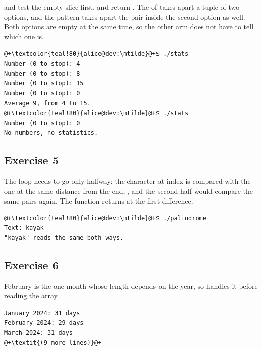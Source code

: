  and  test the empty slice first, and return
. The  of  takes apart a tuple of two
options, and the pattern  takes apart the
pair inside the second option as well. Both options are empty at the same time,
so the other arm does not have to tell which one is.


\vspace{-10pt}%
\begin{lstlisting}[style=bashVerb, escapechar=@+]
@+\textcolor{teal!80}{alice@dev:\mtilde}@+$ ./stats
Number (0 to stop): 4
Number (0 to stop): 8
Number (0 to stop): 15
Number (0 to stop): 0
Average 9, from 4 to 15.
@+\textcolor{teal!80}{alice@dev:\mtilde}@+$ ./stats
Number (0 to stop): 0
No numbers, no statistics.
\end{lstlisting}

\subsection*{Exercise 5}

The loop needs to go only halfway: the character at index  is compared
with the one at the same distance from the end, , and
the second half would compare the same pairs again. The function returns
 at the first difference.


\vspace{-10pt}%
\begin{lstlisting}[style=bashVerb, escapechar=@+]
@+\textcolor{teal!80}{alice@dev:\mtilde}@+$ ./palindrome
Text: kayak
"kayak" reads the same both ways.
\end{lstlisting}

\subsection*{Exercise 6}

February is the one month whose length depends on the year, so 
handles it before reading the array.


\vspace{-10pt}%
\begin{lstlisting}[style=bashVerb, escapechar=@+]
January 2024: 31 days
February 2024: 29 days
March 2024: 31 days
@+\textit{(9 more lines)}@+
\end{lstlisting}

